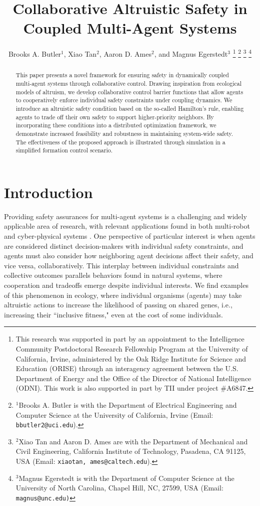 \documentclass[letterpaper, 10 pt, conference]{ieeeconf}  %
\title{\LARGE \bf
Collaborative Altruistic Safety in Coupled Multi-Agent Systems \vspace{-1.5ex}
}
\author{Brooks A. Butler$^1$, Xiao Tan$^2$, Aaron D. Ames$^2$, and Magnus Egerstedt$^3$
\thanks{This research was supported in part by an appointment to the Intelligence Community Postdoctoral Research Fellowship Program at the University of California, Irvine, administered by the Oak Ridge Institute for Science and Education (ORISE) through an interagency agreement between the U.S. Department of Energy and the Office of the Director of National Intelligence (ODNI). This work is also supported in part by TII under project \#A6847.}
\thanks{$^1$Brooks A. Butler is with the Department of Electrical Engineering and Computer Science at the University of California, Irvine (Email: {\tt\small bbutler2@uci.edu}).}
\thanks{$^2$Xiao Tan and Aaron D. Ames are with the Department of Mechanical and Civil Engineering, California Institute of Technology, Pasadena, CA 91125, USA (Email: {\tt\small xiaotan, ames@caltech.edu}).}
\thanks{$^3$Magnus Egerstedt is with the Department of Computer Science at the University of North Carolina, Chapel Hill, NC, 27599, USA (Email: {\tt\small magnus@unc.edu)}}
}
\theoremstyle{plain}
\begin{document}
\IEEEaftertitletext{\vspace{-1.5\baselineskip}}

\maketitle
\thispagestyle{empty}
\pagestyle{empty}


\begin{abstract}
This paper presents a novel framework for ensuring safety in dynamically coupled multi-agent systems through collaborative control. Drawing inspiration from ecological models of altruism, we develop collaborative control barrier functions that allow agents to cooperatively enforce individual safety constraints under coupling dynamics. We introduce an altruistic safety condition based on the so-called Hamilton’s rule, enabling agents to trade off their own safety to support higher-priority neighbors. By incorporating these conditions into a distributed optimization framework, we demonstrate increased feasibility and robustness in maintaining system-wide safety. The effectiveness of the proposed approach is illustrated through simulation in a simplified formation control scenario.
\end{abstract}

\section{Introduction}
Providing safety assurances for multi-agent systems is a challenging and widely applicable area of research, with relevant applications found in both multi-robot \cite{wang2017safety,lippi2020human} and cyber-physical systems \cite{zhang2021physical,chen2020safety,wang2023distributed}. One perspective of particular interest is when agents are considered distinct decision-makers with individual safety constraints, and agents must also consider how neighboring agent decisions affect their safety, and vice versa, collaboratively. 
This interplay between individual constraints and collective outcomes parallels behaviors found in natural systems, where cooperation and tradeoffs emerge despite individual interests.
We find examples of this phenomenon in ecology, where individual organisms (agents) may take altruistic actions to increase the likelihood of passing on shared genes, i.e., increasing their ``inclusive fitness," even at the cost of some individuals. 
\end{document}
